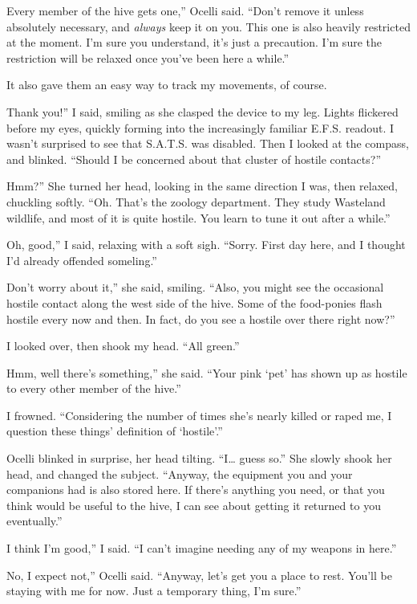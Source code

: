 \leavevmode{}Every member of the hive gets one,” Ocelli said. “Don’t remove it unless absolutely necessary, and \textit{always} keep it on you. This one is also heavily restricted at the moment. I’m sure you understand, it’s just a precaution. I’m sure the restriction will be relaxed once you’ve been here a while.”

It also gave them an easy way to track my movements, of course.

\leavevmode{}Thank you!” I said, smiling as she clasped the device to my leg. Lights flickered before my eyes, quickly forming into the increasingly familiar E.F.S. readout. I wasn’t surprised to see that S.A.T.S. was disabled. Then I looked at the compass, and blinked. “Should I be concerned about that cluster of hostile contacts?”

\leavevmode{}Hmm?” She turned her head, looking in the same direction I was, then relaxed, chuckling softly. “Oh. That’s the zoology department. They study Wasteland wildlife, and most of it is quite hostile. You learn to tune it out after a while.”

\leavevmode{}Oh, good,” I said, relaxing with a soft sigh. “Sorry. First day here, and I thought I’d already offended someling.”

\leavevmode{}Don’t worry about it,” she said, smiling. “Also, you might see the occasional hostile contact along the west side of the hive. Some of the food-ponies flash hostile every now and then. In fact, do you see a hostile over there right now?”

I looked over, then shook my head. “All green.”

\leavevmode{}Hmm, well there’s something,” she said. “Your pink ‘pet’ has shown up as hostile to every other member of the hive.”

I frowned. “Considering the number of times she’s nearly killed or raped me, I question these things’ definition of ‘hostile’.”

Ocelli blinked in surprise, her head tilting. “I… guess so.” She slowly shook her head, and changed the subject. “Anyway, the equipment you and your companions had is also stored here. If there’s anything you need, or that you think would be useful to the hive, I can see about getting it returned to you eventually.”

\leavevmode{}I think I’m good,” I said. “I can’t imagine needing any of my weapons in here.”

\leavevmode{}No, I expect not,” Ocelli said. “Anyway, let’s get you a place to rest. You’ll be staying with me for now. Just a temporary thing, I’m sure.”

